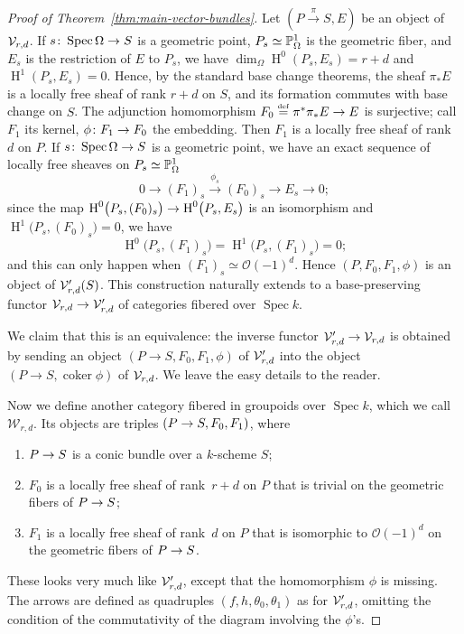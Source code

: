 \documentclass{amsart}
\numberwithin{equation}{section}
\numberwithin{subsection}{section}
\newenvironment{enumeratea}
{\begin{enumerate}[\upshape (a)]}
{\end{enumerate}}
\theoremstyle{definition}
\theoremstyle{remark}
\newcommand\cO{\mathcal{O}} \newcommand\cP{\mathcal{P}}
\newcommand\cW{\mathcal{W}} \newcommand\cX{\mathcal{X}}
\newcommand\arr{\ifinner\to\else\longrightarrow\fi}
\newcommand\larr{\longrightarrow}
\newcommand{\xarr}{\xrightarrow}
\renewcommand\H{\operatorname{H}}
\newcommand\eqdef{\overset{\mathrm{\scriptscriptstyle def}} =}
\newcommand\spec{\operatorname{Spec}}
\newcommand\coker{\operatorname{coker}}
\newcommand{\vect}[1][r,d]{\cV_{#1}}
\newcommand{\vectalt}[1][r,d]{\cV'_{#1}}
\newcommand{\vectaux}[1][r,d]{\cW_{#1}}
\begin{document}
\begin{proof}[Proof of Theorem~\ref{thm:main-vector-bundles}]
Let $(P\xarr{\pi} S, E)$ be an object of $\vect$. If $s\colon \spec\Omega \arr S$ is a geometric point, $P_{s} \simeq \mathbb{P}^{1}_{\Omega}$ is the geometric fiber, and $E_{s}$ is the restriction of $E$ to $P_{s}$, we have $\dim_{\Omega}\H^{0}(P_{s}, E_{s}) = r+d$ and $\H^{1}(P_{s}, E_{s}) = 0$. Hence, by the standard base change theorems, the sheaf $\pi_{*}E$ is a locally free sheaf of rank $r+d$ on $S$, and its formation commutes with base change on $S$. The adjunction homomorphism $F_{0} \eqdef \pi^{*}\pi_{*}E \arr E$ is surjective; call $F_{1}$ its kernel, $\phi\colon F_{1} \arr F_{0}$ the embedding. Then $F_{1}$ is a locally free sheaf of rank~$d$ on $P$. If $s\colon \spec \Omega \arr S$ is a geometric point, we have an exact sequence of locally free sheaves on $P_{s}\simeq \mathbb{P}^{1}_{\Omega}$
   \[
   0 \larr (F_{1})_{s} \stackrel{\phi_{s}}{\larr} (F_{0})_{s} \larr E_{s}
   \larr 0;
   \]
since the map $\H^{0}\bigl(P_{s}, (F_{0})_{s}\bigr) \arr \H^{0}\bigl(P_{s}, E_{s}\bigr)$ is an isomorphism and $\H^{1}\bigl(P_{s}, (F_{0})_{s}\bigr) = 0$, we have
   \[
   \H^{0}\bigl(P_{s}, (F_{1})_{s}\bigr)
   = \H^{1}\bigl(P_{s}, (F_{1})_{s}\bigr)
   = 0;
   \]
and this can only happen when $(F_{1})_{s} \simeq \cO(-1)^{d}$. Hence $(P, F_{0}, F_{1}, \phi)$ is an object of $\vectalt(S)$. This construction naturally extends to a base-preserving functor $\vect \arr \vectalt$ of categories fibered over $\spec k$.

We claim that this is an equivalence: the inverse functor $\vectalt \arr \vect$ is obtained by sending an object $(P \to S, F_{0}, F_{1}, \phi)$ of $\vectalt$ into the object $(P \to S, \coker \phi)$ of $\vect$. We leave the easy details to the reader.

Now we define another category fibered in groupoids over $\spec k$, which we call $\vectaux$. Its objects are triples $(P \arr S, F_{0}, F_{1})$, where

\begin{enumeratea}

\item $P \arr S$ is a conic bundle over a $k$-scheme $S$;

\item $F_{0}$ is a locally free sheaf of rank~$r+d$ on $P$ that is trivial on the geometric fibers of $P \arr S$;

\item $F_{1}$ is a locally free sheaf of rank~$d$ on $P$ that is isomorphic to $\cO(-1)^{d}$ on the geometric fibers of $P \arr S$.

\end{enumeratea}
These looks very much like $\vectalt$, except that the homomorphism $\phi$ is missing. The arrows are defined as quadruples $(f, h, \theta_{0}, \theta_{1})$ as for $\vectalt$, omitting the condition of the commutativity of the diagram involving the $\phi$'s.


\end{proof}
\end{document}
